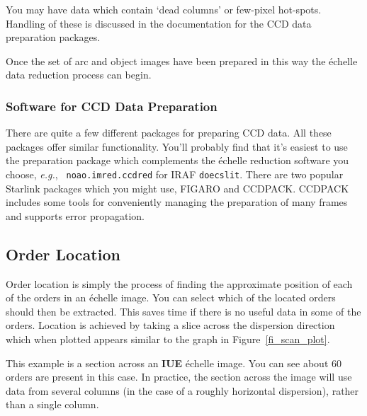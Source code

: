 \documentclass[twoside,11pt]{article}
\newcommand{\htmlref}[2]{#1}
\newcommand{\xref}[3]{#1}
\newcommand{\xlabel}[1]{}
\newcommand{\sgspec}[2]{#1}
\newcommand{\sgspec}[2]{#2}
\begin{document}
You may have data which contain `dead columns' or few-pixel hot-spots.
Handling of these is discussed in the documentation for the CCD data
preparation packages.

Once the set of arc and object images have been prepared in this way the
\'{e}chelle data reduction process can begin.


\subsubsection{Software for CCD Data Preparation}

There are quite a few different packages for preparing CCD data. All
these packages offer similar functionality.  You'll probably find that
it's easiest to use the preparation package which complements the
\'{e}chelle reduction software you choose, {\em e.g.}, {\tt
noao.imred.ccdred} for IRAF {\tt doecslit}\@.  There are two popular
Starlink packages which you might use,
\xref{FIGARO}{sun86}{} and \xref{CCDPACK}{sun139}{}\@.  CCDPACK includes
some tools for conveniently managing the preparation of many frames and
supports error propagation.


\subsection{\label{se_order_location}\xlabel{order_location}Order Location}

Order location is simply the process of finding the approximate position
of each of the orders in an \'{e}chelle image.  You can select which of the
located orders should then be extracted.  This saves time if there is no
useful data in some of the orders.  Location is achieved by taking a
slice across the dispersion direction which when plotted appears similar
to the graph \sgspec{in Figure~\ref{fi_scan_plot}\@.}{below.}

This example is a section across an \htmlref{{\bf IUE}}{gl_iue} \'{echelle}
image.
You can see about 60 orders are present in this case.
In practice, the section across the image will use data from several
columns (in the case of a roughly horizontal dispersion), rather than
a single column.
\end{document}
